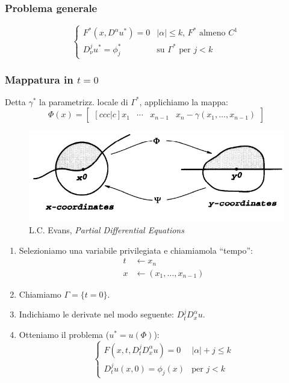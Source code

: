 \documentclass[serif,notheorems]{beamer}
\theoremstyle{definition} %
\theoremstyle{remark}
\begin{document}
\begin{frame}
\frametitle{Problema generale}
\begin{equation*}
\begin{cases}
F^*(x,D^\alpha u^*)=0 & |\alpha | \leq k, \, F^* \text{ almeno } C^1\\
D^j_\nu u^* = \phi_j^* & \text{su } \Gamma^* \text{ per }j<k 
\end{cases}
\end{equation*}
\end{frame}

\begin{frame}
\frametitle{Mappatura in $t=0$}
Detta $\gamma^*$ la parametrizz. locale di $\Gamma^*$, applichiamo la mappa:
$$\Phi (x) = 
\begin{bmatrix}[ccc|c]
x_1 & \cdots & x_{n-1} & x_n-\gamma (x_1,\ldots , x_{n-1}) 
\end{bmatrix}$$
\begin{figure}[H]
\centering
\includegraphics[scale=.35]{flatb}
\caption{\tiny{L.C. Evans, \textit{Partial Differential Equations}}}
\end{figure}
\end{frame}

\begin{frame}
\begin{enumerate}
\item Selezioniamo una variabile privilegiata e chiamiamola ``tempo'':
\begin{align*}
t & \leftarrow x_n \\
x & \leftarrow (x_1,\ldots , x_{n-1})
\end{align*}
\item Chiamiamo $\Gamma = \{t=0\}$.
\item Indichiamo le derivate nel modo seguente: $D^j_t D^\alpha_x u$.
\item Otteniamo il problema ($u^*=u(\Phi)$):
\begin{equation*}
\begin{cases}
F(x,t, D^j_t D^\alpha_x u)=0 & |\alpha | +j \leq k\\
D^j_t u (x,0)= \phi_j(x) & \text{per }j<k 
\end{cases}
\end{equation*}
\end{enumerate}
\end{frame}
\end{document}
